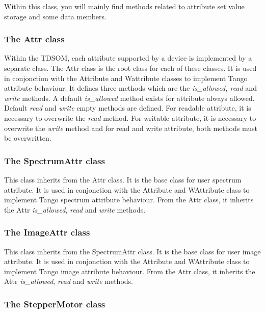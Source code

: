 Within this class, you will mainly find methods related to attribute
set value storage and some data members.

\subsubsection{The Attr class}

Within the TDSOM, each attribute supported by a device
is implemented by a separate class. The Attr class is
the root class for each of these classes. It is used in conjonction
with the Attribute and Wattribute classes to implement Tango attribute
behaviour. It defines three methods which are the \emph{is\_allowed,
read} and \emph{write} methods. A default \emph{is\_allowed} method
exists for attribute always allowed. Default \emph{read} and \emph{write}
empty methods are defined. For readable attribute, it is necessary
to overwrite the \emph{read} method. For writable attribute, it is
necessary to overwrite the \emph{write} method and for read and write
attribute, both methods must be overwritten.

\subsubsection{The SpectrumAttr class}

This class inherits from the Attr class. It is the base class for
user spectrum attribute. It is used in conjonction with the Attribute
and WAttribute class to implement Tango spectrum attribute behaviour.
From the Attr class, it inherits the Attr \emph{is\_allowed}, \emph{read}
and \emph{write} methods.

\subsubsection{The ImageAttr class}

This class inherits from the SpectrumAttr class. It is the base class
for user image attribute. It is used in conjonction with the Attribute
and WAttribute class to implement Tango image attribute behaviour.
From the Attr class, it inherits the Attr \emph{is\_allowed}, \emph{read}
and \emph{write} methods.

\subsubsection{The StepperMotor class}


